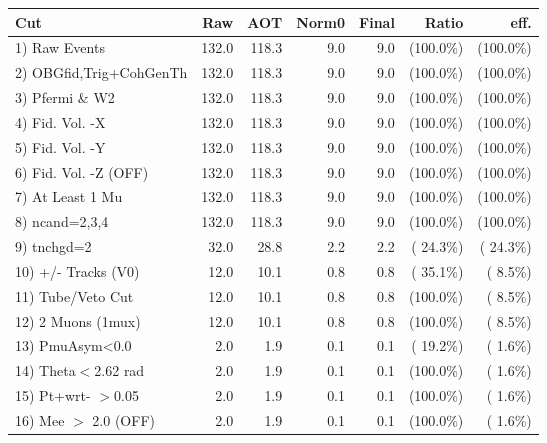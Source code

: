  \begin{table}[h!]\centering
 \begin{tabular}{||l||r|r|r|r|r|r||}
 \hline
 \hline
 Cut & Raw & AOT & Norm0 & Final & Ratio & eff.       \\
 \hline
  1) Raw Events           &        132.0 &        118.3 &          9.0 &          9.0 & (100.0\%) & (100.0\%) \\
  2) OBGfid,Trig+CohGenTh &        132.0 &        118.3 &          9.0 &          9.0 & (100.0\%) & (100.0\%) \\
  3) Pfermi \& W2         &        132.0 &        118.3 &          9.0 &          9.0 & (100.0\%) & (100.0\%) \\
  4) Fid. Vol. -X         &        132.0 &        118.3 &          9.0 &          9.0 & (100.0\%) & (100.0\%) \\
  5) Fid. Vol. -Y         &        132.0 &        118.3 &          9.0 &          9.0 & (100.0\%) & (100.0\%) \\
  6) Fid. Vol. -Z (OFF)   &        132.0 &        118.3 &          9.0 &          9.0 & (100.0\%) & (100.0\%) \\
  7) At Least 1 Mu        &        132.0 &        118.3 &          9.0 &          9.0 & (100.0\%) & (100.0\%) \\
  8) ncand=2,3,4          &        132.0 &        118.3 &          9.0 &          9.0 & (100.0\%) & (100.0\%) \\
  9) tnchgd=2             &         32.0 &         28.8 &          2.2 &          2.2 & ( 24.3\%) & ( 24.3\%) \\
 10) +/- Tracks (V0)      &         12.0 &         10.1 &          0.8 &          0.8 & ( 35.1\%) & (  8.5\%) \\
 11) Tube/Veto Cut        &         12.0 &         10.1 &          0.8 &          0.8 & (100.0\%) & (  8.5\%) \\
 12) 2 Muons (1mux)       &         12.0 &         10.1 &          0.8 &          0.8 & (100.0\%) & (  8.5\%) \\
 13) PmuAsym<0.0          &          2.0 &          1.9 &          0.1 &          0.1 & ( 19.2\%) & (  1.6\%) \\
 14) Theta$<$2.62 rad     &          2.0 &          1.9 &          0.1 &          0.1 & (100.0\%) & (  1.6\%) \\
 15) Pt+wrt- $>$0.05      &          2.0 &          1.9 &          0.1 &          0.1 & (100.0\%) & (  1.6\%) \\
 16) Mee $>$ 2.0  (OFF)   &          2.0 &          1.9 &          0.1 &          0.1 & (100.0\%) & (  1.6\%) \\

\end{tabular}
\end{table}
